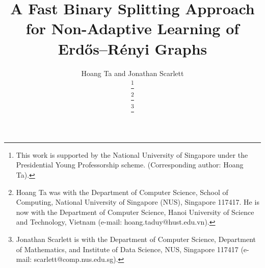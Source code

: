 \documentclass[journal]{IEEEtran}
\theoremstyle{definition}
\theoremstyle{definition}
\begin{document}
\title{A Fast Binary Splitting Approach for Non-Adaptive Learning of Erd\H{o}s--R\'enyi Graphs}
%
%


%        


\author{Hoang Ta and Jonathan Scarlett


\thanks{This work is supported by the National University of Singapore under the Presidential Young Professorship scheme. \scriptsize (Corresponding author: Hoang Ta).}

\thanks{ Hoang Ta was with the Department of Computer Science, School of Computing, National University of Singapore (NUS), Singapore 117417. He is now with the Department of Computer Science, Hanoi University of Science and Technology, Vietnam (e-mail: hoang.taduy@hust.edu.vn).}
 

\thanks{Jonathan Scarlett is with the Department of Computer Science, Department of Mathematics, and Institute of Data Science, NUS, Singapore 117417 (e-mail: scarlett@comp.nus.edu.sg).}
}







\maketitle
\end{document}

